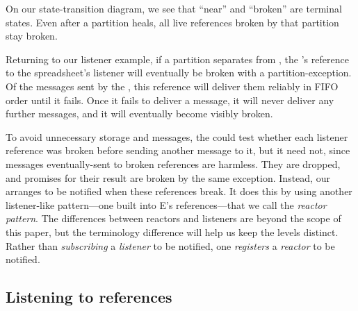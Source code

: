 \documentclass{llncs}
\begin{document}
On our state-transition diagram, we see that ``near'' and ``broken''
are terminal states. Even after a partition heals, all live references
broken by that partition stay broken.

Returning to our listener example, if a partition separates 
from , the 's reference to the spreadsheet's
listener will eventually be broken with a partition-exception. Of the
 messages sent by the , this
reference will deliver them reliably in FIFO order until it
fails. Once it fails to deliver a message, it will never deliver any
further messages, and it will eventually become visibly broken.

To avoid unnecessary storage and messages, the 
could test whether each listener reference was broken before sending
another  message to it, but it need not, since
messages eventually-sent to broken references are harmless. They are
dropped, and promises for their result are broken by the same
exception. Instead, our  arranges to be notified
when these references break. It does this by using another
listener-like pattern---one built into E's references---that we call
the \emph{reactor pattern}. The differences between reactors and
listeners are beyond the scope of this paper, but the terminology
difference will help us keep the levels distinct. Rather than
\emph{subscribing} a \emph{listener} to be notified, one
\emph{registers} a \emph{reactor} to be notified.

\subsection{Listening to references}
\end{document}
